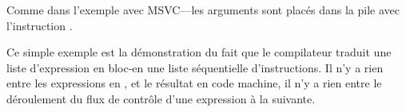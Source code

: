 Comme dans l'exemple avec MSVC---les arguments sont placés dans la pile avec l'instruction
\MOV.


Ce simple exemple est la démonstration du fait que le compilateur traduit
une liste d'expression en bloc-\CCpp en une liste séquentielle d'instructions.
Il n'y a rien entre les expressions en \CCpp, et le résultat en code machine,
il n'y a rien entre le déroulement du flux de contrôle d'une expression à la suivante.
